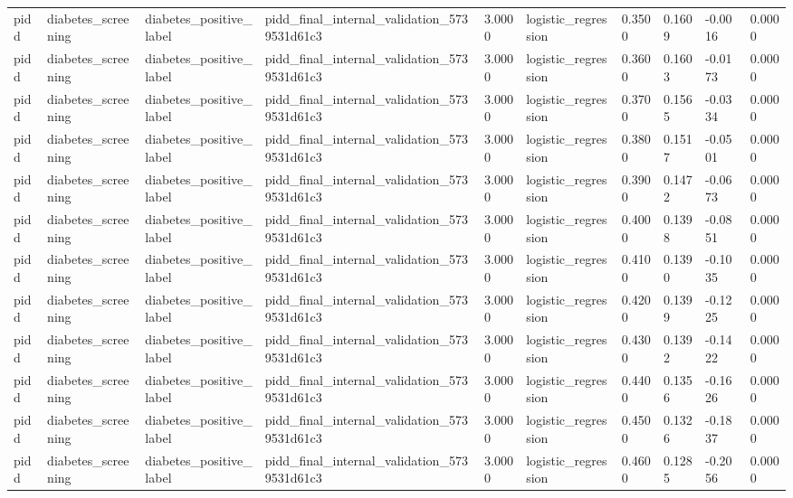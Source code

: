 \begin{tabular}{llllllllll}
pidd & diabetes\_screening & diabetes\_positive\_label & pidd\_final\_internal\_validation\_5739531d61c3 & 3.0000 & logistic\_regression & 0.3500 & 0.1609 & -0.0016 & 0.0000 \\
pidd & diabetes\_screening & diabetes\_positive\_label & pidd\_final\_internal\_validation\_5739531d61c3 & 3.0000 & logistic\_regression & 0.3600 & 0.1603 & -0.0173 & 0.0000 \\
pidd & diabetes\_screening & diabetes\_positive\_label & pidd\_final\_internal\_validation\_5739531d61c3 & 3.0000 & logistic\_regression & 0.3700 & 0.1565 & -0.0334 & 0.0000 \\
pidd & diabetes\_screening & diabetes\_positive\_label & pidd\_final\_internal\_validation\_5739531d61c3 & 3.0000 & logistic\_regression & 0.3800 & 0.1517 & -0.0501 & 0.0000 \\
pidd & diabetes\_screening & diabetes\_positive\_label & pidd\_final\_internal\_validation\_5739531d61c3 & 3.0000 & logistic\_regression & 0.3900 & 0.1472 & -0.0673 & 0.0000 \\
pidd & diabetes\_screening & diabetes\_positive\_label & pidd\_final\_internal\_validation\_5739531d61c3 & 3.0000 & logistic\_regression & 0.4000 & 0.1398 & -0.0851 & 0.0000 \\
pidd & diabetes\_screening & diabetes\_positive\_label & pidd\_final\_internal\_validation\_5739531d61c3 & 3.0000 & logistic\_regression & 0.4100 & 0.1390 & -0.1035 & 0.0000 \\
pidd & diabetes\_screening & diabetes\_positive\_label & pidd\_final\_internal\_validation\_5739531d61c3 & 3.0000 & logistic\_regression & 0.4200 & 0.1399 & -0.1225 & 0.0000 \\
pidd & diabetes\_screening & diabetes\_positive\_label & pidd\_final\_internal\_validation\_5739531d61c3 & 3.0000 & logistic\_regression & 0.4300 & 0.1392 & -0.1422 & 0.0000 \\
pidd & diabetes\_screening & diabetes\_positive\_label & pidd\_final\_internal\_validation\_5739531d61c3 & 3.0000 & logistic\_regression & 0.4400 & 0.1356 & -0.1626 & 0.0000 \\
pidd & diabetes\_screening & diabetes\_positive\_label & pidd\_final\_internal\_validation\_5739531d61c3 & 3.0000 & logistic\_regression & 0.4500 & 0.1326 & -0.1837 & 0.0000 \\
pidd & diabetes\_screening & diabetes\_positive\_label & pidd\_final\_internal\_validation\_5739531d61c3 & 3.0000 & logistic\_regression & 0.4600 & 0.1285 & -0.2056 & 0.0000 \\

\end{tabular}
